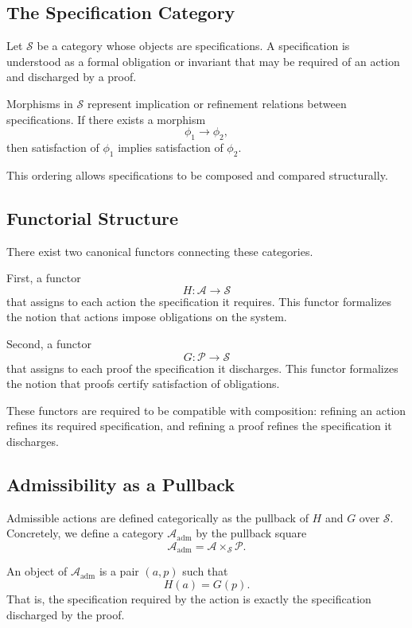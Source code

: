 \documentclass[11pt,oneside]{article}
\begin{document}
\subsection{The Specification Category}

Let \( \mathcal{S} \) be a category whose objects are specifications. A specification is understood as a formal obligation or invariant that may be required of an action and discharged by a proof.

Morphisms in \( \mathcal{S} \) represent implication or refinement relations between specifications. If there exists a morphism
\[
\phi_1 \to \phi_2,
\]
then satisfaction of \( \phi_1 \) implies satisfaction of \( \phi_2 \).

This ordering allows specifications to be composed and compared structurally.

\subsection{Functorial Structure}

There exist two canonical functors connecting these categories.

First, a functor
\[
H : \mathcal{A} \to \mathcal{S}
\]
that assigns to each action the specification it requires. This functor formalizes the notion that actions impose obligations on the system.

Second, a functor
\[
G : \mathcal{P} \to \mathcal{S}
\]
that assigns to each proof the specification it discharges. This functor formalizes the notion that proofs certify satisfaction of obligations.

These functors are required to be compatible with composition: refining an action refines its required specification, and refining a proof refines the specification it discharges.

\subsection{Admissibility as a Pullback}

Admissible actions are defined categorically as the pullback of \( H \) and \( G \) over \( \mathcal{S} \). Concretely, we define a category \( \mathcal{A}_{\mathrm{adm}} \) by the pullback square
\[
\mathcal{A}_{\mathrm{adm}} = \mathcal{A} \times_{\mathcal{S}} \mathcal{P}.
\]

An object of \( \mathcal{A}_{\mathrm{adm}} \) is a pair \( (a, p) \) such that
\[
H(a) = G(p).
\]
That is, the specification required by the action is exactly the specification discharged by the proof.
\end{document}
